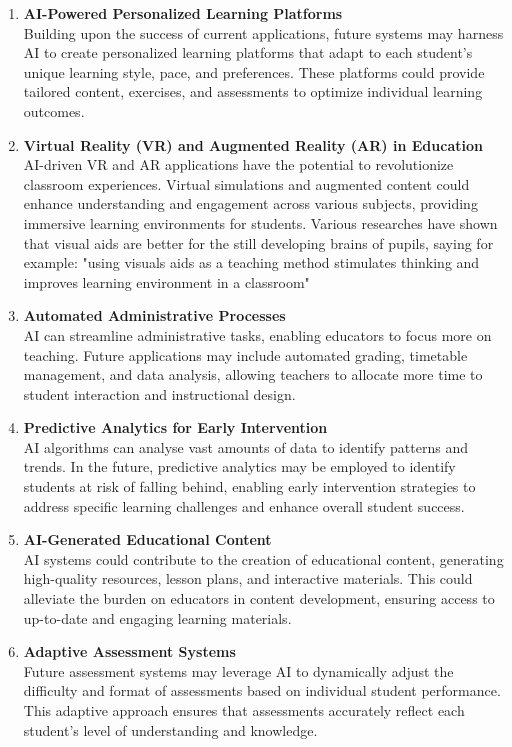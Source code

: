 \documentclass[a4paper,12pt]{report}
\begin{document}
\begin{enumerate}
\item{\textbf{AI-Powered Personalized Learning Platforms}}\\
Building upon the success of current applications, future systems may harness AI to create personalized learning platforms that adapt to each student's unique learning style, pace, and preferences. These platforms could provide tailored content, exercises, and assessments to optimize individual learning outcomes.

\item{\textbf{Virtual Reality (VR) and Augmented Reality (AR) in Education}}\\
AI-driven VR and AR applications have the potential to revolutionize classroom experiences. Virtual simulations and augmented content could enhance understanding and engagement across various subjects, providing immersive learning environments for students. Various researches have shown that visual aids are better for the still developing brains of pupils, saying for example: "using visuals aids as a teaching method stimulates thinking and improves learning environment in a classroom" ~\cite{visual}

\item{\textbf{Automated Administrative Processes}}\\
AI can streamline administrative tasks, enabling educators to focus more on teaching. Future applications may include automated grading, timetable management, and data analysis, allowing teachers to allocate more time to student interaction and instructional design.\newpage

\item{\textbf{Predictive Analytics for Early Intervention}}\\
AI algorithms can analyse vast amounts of data to identify patterns and trends. In the future, predictive analytics may be employed to identify students at risk of falling behind, enabling early intervention strategies to address specific learning challenges and enhance overall student success.

\item{\textbf{AI-Generated Educational Content}}\\
AI systems could contribute to the creation of educational content, generating high-quality resources, lesson plans, and interactive materials. This could alleviate the burden on educators in content development, ensuring access to up-to-date and engaging learning materials.

\item{\textbf{Adaptive Assessment Systems}}\\
Future assessment systems may leverage AI to dynamically adjust the difficulty and format of assessments based on individual student performance. This adaptive approach ensures that assessments accurately reflect each student's level of understanding and knowledge.
\end{enumerate}
\end{document}
